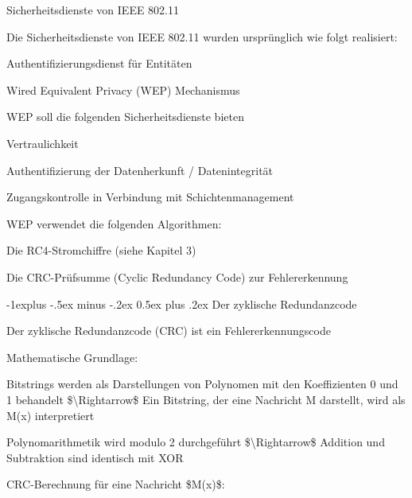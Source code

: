 \documentclass[a4paper]{article}
\makeatletter
\renewcommand{\subsection}{\@startsection{subsection}{2}{0mm}%
 {-1explus -.5ex minus -.2ex}%
 {0.5ex plus .2ex}%
 {\normalfont\normalsize\bfseries}}
\makeatother
\begin{document}
\begin{multicols}{3}
      Sicherheitsdienste von IEEE 802.11

      \begin{itemize*}
            \item
            Die Sicherheitsdienste von IEEE 802.11 wurden ursprünglich wie folgt
            realisiert:

            \begin{itemize*}
                  \item Authentifizierungsdienst für Entitäten
                  \item Wired Equivalent Privacy (WEP) Mechanismus
            \end{itemize*}
            \item
            WEP soll die folgenden Sicherheitsdienste bieten

            \begin{itemize*}
                  \item Vertraulichkeit
                  \item Authentifizierung der Datenherkunft / Datenintegrität
                  \item Zugangskontrolle in Verbindung mit Schichtenmanagement
            \end{itemize*}
            \item
            WEP verwendet die folgenden Algorithmen:

            \begin{itemize*}
                  \item Die RC4-Stromchiffre (siehe Kapitel 3)
                  \item Die CRC-Prüfsumme (Cyclic Redundancy Code) zur Fehlererkennung
            \end{itemize*}
      \end{itemize*}


      \subsection{Der zyklische
            Redundanzcode}

      \begin{itemize*}
            \item
            Der zyklische Redundanzcode (CRC) ist ein Fehlererkennungscode
            \item
            Mathematische Grundlage:

            \begin{itemize*}
                  \item Bitstrings werden als Darstellungen von Polynomen mit den Koeffizienten 0 und 1 behandelt \$\textbackslash Rightarrow\$ Ein Bitstring, der eine Nachricht M darstellt, wird als M(x) interpretiert
                  \item Polynomarithmetik wird modulo 2 durchgeführt \$\textbackslash Rightarrow\$ Addition und Subtraktion sind identisch mit XOR
            \end{itemize*}
            \item
            CRC-Berechnung für eine Nachricht \$M(x)\$:


\end{itemize*}
\end{multicols}
\end{document}
